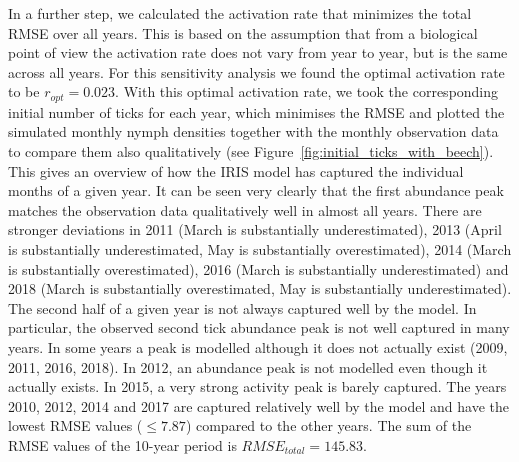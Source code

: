 \documentclass[a4paper, 11pt]{scrartcl}
\begin{document}
In a further step, we calculated the activation rate that minimizes the total RMSE over all years. This is based on the assumption that from a biological point of view the activation rate does not vary from year to year, but is the same across all years. For this sensitivity analysis we found the optimal activation rate to be $r_{opt} = 0.023$. With this optimal activation rate, we took the corresponding initial number of ticks for each year, which minimises the RMSE and plotted the simulated monthly nymph densities together with the monthly observation data to compare them also qualitatively (see Figure~\ref{fig:initial_ticks_with_beech}). This gives an overview of how the IRIS model has captured the individual months of a given year. It can be seen very clearly that the first abundance peak matches the observation data qualitatively well in almost all years. There are stronger deviations in 2011 (March is substantially underestimated), 2013 (April is substantially underestimated, May is substantially overestimated), 2014 (March is substantially overestimated), 2016 (March is substantially underestimated) and 2018 (March is substantially overestimated, May is substantially underestimated). The second half of a given year is not always captured well by the model. In particular, the observed second tick abundance peak is not well captured in many years. In some years a peak is modelled although it does not actually exist (2009, 2011, 2016, 2018). In 2012, an abundance peak is not modelled even though it actually exists. In 2015, a very strong activity peak is barely captured. The years 2010, 2012, 2014 and 2017 are captured relatively well by the model and have the lowest RMSE values ($\leq 7.87$) compared to the other years. The sum of the RMSE values of the 10-year period is $RMSE_{total} = 145.83$.
\end{document}

